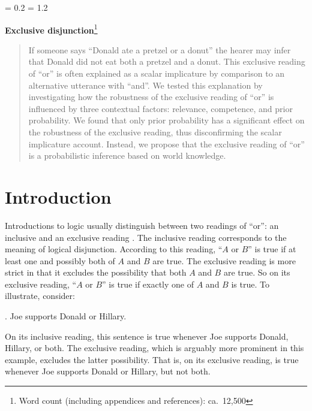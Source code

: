 \documentclass[12pt]{article}
\begin{document}
\Exlabelsep = 0.2\parindent
\SubExleftmargin = 1.2\parindent

\begin{center}
\noindent\LARGE \textbf{Exclusive disjunction}\normalsize\footnote{Word count (including appendices and references): ca.~12,500} \\[.5cm]
\end{center}

\begin{abstract}
  If someone says ``Donald ate a pretzel or a donut'' the hearer may infer that Donald did not
  eat both a pretzel and a donut. This exclusive reading of ``or'' is often explained as a scalar
  implicature by comparison to an alternative utterance with ``and''. We tested this explanation by investigating how the
  robustness of the exclusive reading of ``or'' is influenced by three contextual factors:
  relevance, competence, and prior probability. We found that only prior probability has a
  significant effect on the robustness of the exclusive reading, thus disconfirming the scalar
  implicature account. Instead, we propose that the exclusive reading of ``or'' is a
  probabilistic inference based on world knowledge.
\end{abstract}

\section{Introduction}

Introductions to logic usually distinguish between two readings of ``or'': an inclusive and an exclusive reading \citep[e.g.,][]{mccawley1981, copi2005}. The inclusive reading corresponds to the meaning of logical disjunction. According to this reading, ``$A$ or $B$'' is true if at least one and possibly both of $A$ and $B$ are true. The exclusive reading is more strict in that it excludes the possibility that both $A$ and $B$ are true. So on its exclusive reading, ``$A$ or $B$'' is true if exactly one of $A$ and $B$ is true. To illustrate, consider:

\ex.	\label{ex:support} Joe supports Donald or Hillary.

On its inclusive reading, this sentence is true whenever Joe supports Donald, Hillary, or both. The exclusive reading, which is arguably more prominent in this example, excludes the latter possibility. That is, on its exclusive reading, \Last is true whenever Joe supports Donald or Hillary, but not both.
\end{document}
